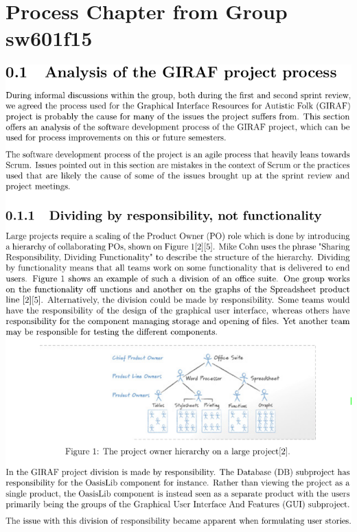 \chapter{Process Chapter from Group sw601f15}\label{app:601}

\includegraphics[page=1,width=\textwidth]{part_appendix/sw601f15.pdf}
